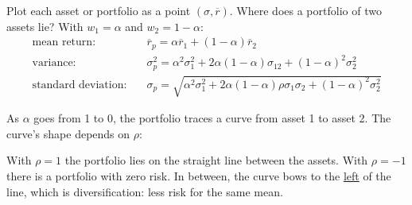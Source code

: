 Plot each asset or portfolio as a point $(\sigma, \overline{r})$. Where does a portfolio of two assets lie? With $w_1 = \alpha$ and $w_2 = 1 - \alpha$:
\[\boxed{\begin{aligned}
    \text{mean return:} &\quad \overline{r}_p = \alpha\overline{r}_1 + (1-\alpha)\overline{r}_2\\
    \text{variance:} &\quad \sigma_p^2 = \alpha^2\sigma_1^2 + 2\alpha(1-\alpha)\sigma_{12} + (1-\alpha)^2\sigma_2^2\\
    \text{standard deviation:} &\quad \sigma_p = \sqrt{\alpha^2\sigma_1^2 + 2\alpha(1-\alpha)\rho\sigma_1\sigma_2 + (1-\alpha)^2\sigma_2^2}
\end{aligned}}\]

As $\alpha$ goes from 1 to 0, the portfolio traces a curve from asset 1 to asset 2. The curve's shape depends on $\rho$:
\begin{center}
\end{center}
With $\rho = 1$ the portfolio lies on the straight line between the assets. With $\rho = -1$ there is a portfolio with zero risk. In between, the curve bows to the \ul{left} of the line, which is diversification: less risk for the same mean.

